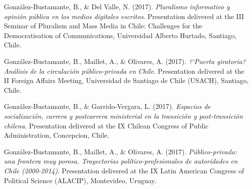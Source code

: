 \begin{publications}
\begin{benumerate}{87}
\item{González-Bustamante, B., \& Del Valle, N. (2017). {\itshape Pluralismo informativo y opinión pública en los medios digitales escritos}. Presentation delivered at the III Seminar of Pluralism and Mass Media in Chile: Challenges for the Democratisation of Communications, Universidad Alberto Hurtado, Santiago, Chile.}\vspace{1mm}


\item{González-Bustamante, B., Maillet, A., \& Olivares, A. (2017). {\itshape ?`Puerta giratoria? Análisis de la circulación público-privada en Chile}. Presentation delivered at the II Foreign Affairs Meeting, Universidad de Santiago de Chile (USACH), Santiago, Chile.}\vspace{1mm}


\item{González-Bustamante, B., \& Garrido-Vergara, L. (2017). {\itshape Espacios de socialización, carrera y postcarrera ministerial en la transición y post-transición chilena}. Presentation delivered at the IX Chilean Congress of Public Administration, Concepcion, Chile.}\vspace{1mm}


\item{González-Bustamante, B., Maillet, A., \& Olivares, A. (2017). {\itshape Público-privado: una frontera muy porosa. Trayectorias político-profesionales de autoridades en Chile (2000-2014)}. Presentation delivered at the IX Latin American Congress of Political Science (ALACIP), Montevideo, Uruguay.}\vspace{1mm}


\end{benumerate}
\end{publications}
